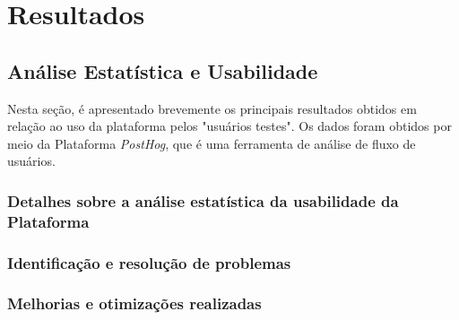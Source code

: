 \part{Resultados}
\chapter[Resultados]{Análise Estatística e Usabilidade}
Nesta seção, é apresentado brevemente os principais resultados obtidos em relação ao uso da plataforma pelos "usuários testes". Os dados foram obtidos por meio da Plataforma \textit{PostHog}, que é uma ferramenta de análise de fluxo de usuários.

\section{Detalhes sobre a análise estatística da usabilidade da Plataforma}
\section{Identificação e resolução de problemas}


\section{Melhorias e otimizações realizadas}
